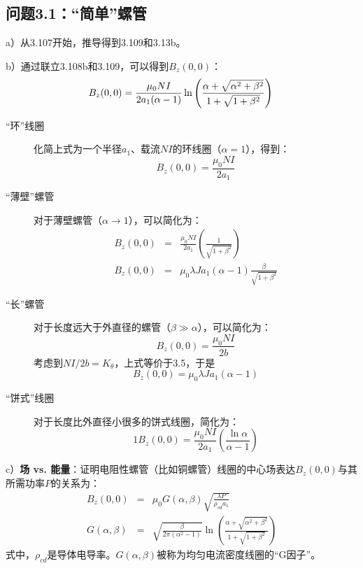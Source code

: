 \subsection{问题3.1：“简单”螺管}
a）从3.107开始，推导得到3.109和3.13b。

b）通过联立3.108b和3.109，可以得到$B_z(0,0)$：
\begin{equation}
B_z(0,0)=\frac{\mu_0NI}{2a_1(\alpha-1)}\ln\left(\frac{\alpha+\sqrt{\alpha^2+\beta^2}}{1+\sqrt{1+\beta^2}}\right)\\%
\end{equation}
\begin{description}
  \item[“环”线圈] 化简上式为一个半径$a_1$、载流$NI$的环线圈（$\alpha=1$），得到：
  \begin{equation}
    B_z(0,0)=\frac{\mu_0NI}{2a_1}%
  \end{equation}
 \item[“薄壁”螺管] 对于薄壁螺管（$\alpha \rightarrow 1$），可以简化为：
 \begin{eqnarray}
   B_z(0,0)&=&\frac{\mu_0NI}{2a_1}\left(\frac{1}{\sqrt{1+\beta^2}}\right)\\ %
   B_z(0,0)&=&\mu_0 \lambda Ja_1(\alpha-1)\frac{\beta}{\sqrt{1+\beta^2}}%
 \end{eqnarray}
  \item[“长”螺管] 对于长度远大于外直径的螺管（$\beta \gg \alpha$），可以简化为：
\begin{equation}
B_z(0,0)=\frac{\mu_0NI}{2b}%
\end{equation}
考虑到$NI/2b=K_\theta$，上式等价于3.5，于是
\begin{equation}
B_z(0,0)=\mu_0\lambda Ja_1(\alpha-1)%
\end{equation}
  \item[“饼式”线圈] 对于长度比外直径小很多的饼式线圈，简化为：
  \begin{equation}1
B_z(0,0)=\frac{\mu_0NI}{2a_1}(\frac{\ln\alpha}{\alpha-1})%
  \end{equation}
\end{description}

c）\textbf{场 vs. 能量}：证明电阻性螺管（比如铜螺管）线圈的中心场表达$B_z(0,0)$与其所需功率$P$的关系为：
\begin{eqnarray}
B_z(0,0)&=&\mu_0G(\alpha,\beta)\sqrt{\frac{\lambda P}{\rho_{cd}a_1}}\\ %
G(\alpha,\beta)&=&\sqrt{\frac{\beta}{2\pi(\alpha^2-1)}}\ln(\frac{\alpha+\sqrt{\alpha^2+\beta^2}}{1+\sqrt{1+\beta^2}})%
\end{eqnarray}
式中，$\rho_{cd}$是导体电导率。$G(\alpha,\beta)$被称为均匀电流密度线圈的“G因子”。

